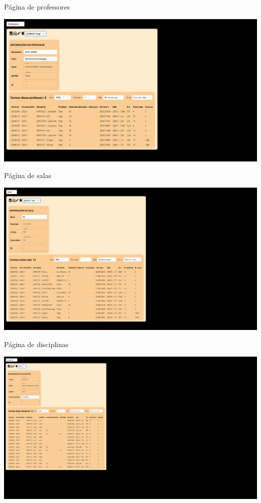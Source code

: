 \begin{MyCenteredFigure} \caption{Página de professores} \label{fig:professores}
  \includegraphics[width=\textwidth]{files/img/2.02!7-resultados/7-Professores.png}
\end{MyCenteredFigure}

\begin{MyCenteredFigure} \caption{Página de salas} \label{fig:salas}
  \includegraphics[width=\textwidth]{files/img/2.02!7-resultados/8-Salas.png}
\end{MyCenteredFigure}

\begin{MyCenteredFigure} \caption{Página de disciplinas} \label{fig:disciplinas}
  \includegraphics[width=\textwidth]{files/img/2.02!7-resultados/9-Disciplinas.png}
\end{MyCenteredFigure}

